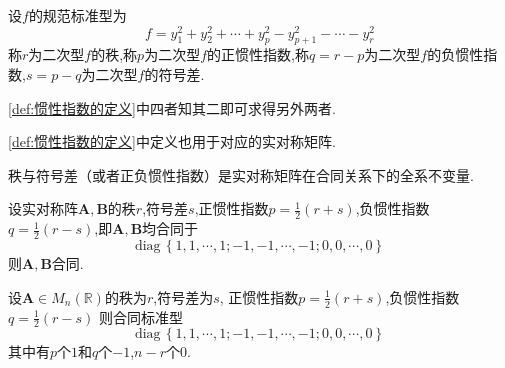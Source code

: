 \begin{formal}
    \begin{definition}[惯性指数的定义]\label{def:惯性指数的定义}
        设$f$的规范标准型为\[
        f=y_1^2+y_2^2+\cdots+y_p^2-y_{p+1}^2-\cdots-y_r^2
        \]称$r$为二次型$f$的秩,称$p$为二次型$f$的正惯性指数,称$q=r-p$为二次型$f$的负惯性指数,$s=p-q$为二次型$f$的符号差.
    \end{definition}
\end{formal}
\begin{red}
\begin{remark}
    \cref{def:惯性指数的定义}中四者知其二即可求得另外两者.

    \cref{def:惯性指数的定义}中定义也用于对应的实对称矩阵.
\end{remark}
\end{red}
\begin{formal}
    \begin{theorem}[合同全系不变量]\label{thm:合同全系不变量}
        秩与符号差（或者正负惯性指数）是实对称矩阵在合同关系下的全系不变量.
    \end{theorem}
    \begin{Proof}
        设实对称阵$\bm{A},\bm{B}$的秩$r$,符号差$s$,正惯性指数$\displaystyle p=\frac{1}{2}\left(r+s\right)$,负惯性指数$q=\displaystyle \frac{1}{2}\left(r-s\right)$,即$\bm{A},\bm{B}$均合同于\[
        \mathrm{diag}\,\left\{
            1,1,\cdots,1;-1,-1,\cdots,-1;0,0,\cdots,0
        \right\}
        \]则$\bm{A},\bm{B}$合同.
    \end{Proof}
\end{formal}
\begin{formal}
    \begin{definition}[合同标准型的定义]\label{def:合同标准型的定义}
        设$\bm{A}\in M_n\left(\mathbb{R}\right)$的秩为$r$,符号差为$s$,
        正惯性指数$\displaystyle
         p=\frac{1}{2}\left(r+s\right)$,负惯性指数$q=\displaystyle \frac{1}{2}\left(r-s\right)
        $
        则合同标准型\[
        \mathrm{diag}\,\left\{
            1,1,\cdots,1;-1,-1,\cdots,-1;0,0,\cdots,0
        \right\}
        \]其中有$p$个$1$和$q$个$-1$,$n-r$个$0$.
    \end{definition}
\end{formal}
